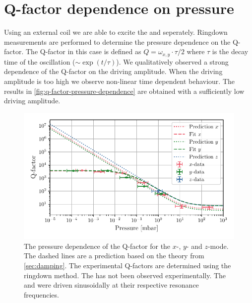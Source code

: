 \section{Q-factor dependence on pressure}
\label{sec:q-factor-dependence-on-pressure}
Using an external coil we are able to excite the \xmode  and \ymode seperately. Ringdown measurements are performed to determine the pressure dependence on the Q-factor. The Q-factor in this case is defined as $Q = \omega_{x,y} \cdot \tau / 2$ where $\tau$ is the decay time of the oscillation ($\sim \exp\left(t / \tau\right)$). We qualitatively observed a strong dependence of the Q-factor on the driving amplitude. When the driving amplitude is too high we observe non-linear time dependent behaviour. The results in \autoref{fig:q-factor-pressure-dependence} are obtained with a sufficiently low driving amplitude.

\begin{figure}
    \centering
    \includegraphics{figures/data/q_factor_pressure_dependence.pdf}
    \caption{The pressure dependence of the Q-factor for the $x$-, $y$- and $z$-mode. The dashed lines are a prediction based on the theory from \autoref{sec:damping}. The experimental Q-factors are determined using the ringdown method. The \zmode has not been observed experimentally. The \xmode and \ymode were driven sinusoidally at their respective resonance frequencies.}
    \label{fig:q-factor-pressure-dependence}
\end{figure}

